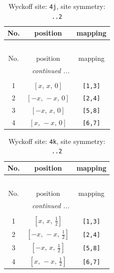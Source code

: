 \documentclass[fleqn,8pt]{jsarticle}
\begin{document}
\begin{longtable}{ccc}
\caption{Wyckoff site: {\tt 4j}, site symmetry: {\tt ..2}}
 \\
 \hline \hline
No. & position & mapping \\ \hline \endfirsthead

\multicolumn{2}{l}{\tablename\ \thetable{}} \\
 \hline \hline
No. & position & mapping \\ \hline \endhead

 \hline \hline
\multicolumn{2}{r}{\footnotesize\it continued ...} \\ \endfoot

 \hline \hline
\multicolumn{2}{r}{} \\ \endlastfoot

1 & $\left[ x,\, x,\, 0 \right]$ & {\tt [1,3]} \\ \hline
2 & $\left[ - x,\, - x,\, 0 \right]$ & {\tt [2,4]} \\ \hline
3 & $\left[ - x,\, x,\, 0 \right]$ & {\tt [5,8]} \\ \hline
4 & $\left[ x,\, - x,\, 0 \right]$ & {\tt [6,7]} \\
\end{longtable}
\renewcommand{\arraystretch}{1.2}
\begin{longtable}{ccc}
\caption{Wyckoff site: {\tt 4k}, site symmetry: {\tt ..2}}
 \\
 \hline \hline
No. & position & mapping \\ \hline \endfirsthead

\multicolumn{2}{l}{\tablename\ \thetable{}} \\
 \hline \hline
No. & position & mapping \\ \hline \endhead

 \hline \hline
\multicolumn{2}{r}{\footnotesize\it continued ...} \\ \endfoot

 \hline \hline
\multicolumn{2}{r}{} \\ \endlastfoot

1 & $\left[ x,\, x,\, \frac{1}{2} \right]$ & {\tt [1,3]} \\ \hline
2 & $\left[ - x,\, - x,\, \frac{1}{2} \right]$ & {\tt [2,4]} \\ \hline
3 & $\left[ - x,\, x,\, \frac{1}{2} \right]$ & {\tt [5,8]} \\ \hline
4 & $\left[ x,\, - x,\, \frac{1}{2} \right]$ & {\tt [6,7]} \\
\end{longtable}
\end{document}

